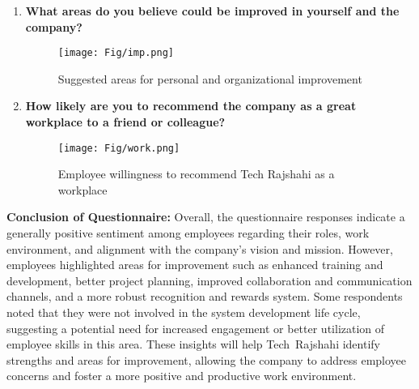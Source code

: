 \documentclass[12pt,a4paper]{article}
\begin{document}
\begin{enumerate}
    \item \textbf{What areas do you believe could be improved in yourself and the company?}  
    \begin{figure}[H]
        \centering
        \texttt{[image: Fig/imp.png]}
        \caption{Suggested areas for personal and organizational improvement}
        \label{fig:improvement_areas}
    \end{figure}

    \item \textbf{How likely are you to recommend the company as a great workplace to a friend or colleague?}  
    \begin{figure}[H]
        \centering
        \texttt{[image: Fig/work.png]}
        \caption{Employee willingness to recommend Tech Rajshahi as a workplace}
        \label{fig:recommendation}
    \end{figure}
\end{enumerate}

\textbf{Conclusion of Questionnaire:}  Overall, the questionnaire responses indicate a generally positive sentiment among employees regarding their roles, work environment, and alignment with the company’s vision and mission.  However, employees highlighted areas for improvement such as enhanced training and development, better project planning, improved collaboration and communication channels, and a more robust recognition and rewards system.  Some respondents noted that they were not involved in the system development life cycle, suggesting a potential need for increased engagement or better utilization of employee skills in this area.  These insights will help Tech Rajshahi identify strengths and areas for improvement, allowing the company to address employee concerns and foster a more positive and productive work environment.
\end{document}
